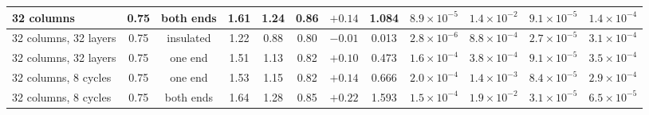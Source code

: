 \begin{tabular}{lccccccccccc}
32 columns & 0.75 & both ends & 1.61 & 1.24 & 0.86 & $+0.14$ & 1.084 & $8.9\times10^{-5}$ & $1.4\times10^{-2}$ & $9.1\times10^{-5}$ & $1.4\times10^{-4}$ \\
\hline
32 columns, 32 layers & 0.75 & insulated & 1.22 & 0.88 & 0.80 & $-0.01$ & 0.013 & $2.8\times10^{-6}$ & $8.8\times10^{-4}$ & $2.7\times10^{-5}$ & $3.1\times10^{-4}$ \\
32 columns, 32 layers & 0.75 & one end & 1.51 & 1.13 & 0.82 & $+0.10$ & 0.473 & $1.6\times10^{-4}$ & $3.8\times10^{-4}$ & $9.1\times10^{-5}$ & $3.5\times10^{-4}$ \\
\hline
32 columns, 8 cycles & 0.75 & one end & 1.53 & 1.15 & 0.82 & $+0.14$ & 0.666 & $2.0\times10^{-4}$ & $1.4\times10^{-3}$ & $8.4\times10^{-5}$ & $2.9\times10^{-4}$ \\
32 columns, 8 cycles & 0.75 & both ends & 1.64 & 1.28 & 0.85 & $+0.22$ & 1.593 & $1.5\times10^{-4}$ & $1.9\times10^{-2}$ & $3.1\times10^{-5}$ & $6.5\times10^{-5}$ \\
\hline\hline
\end{tabular}
